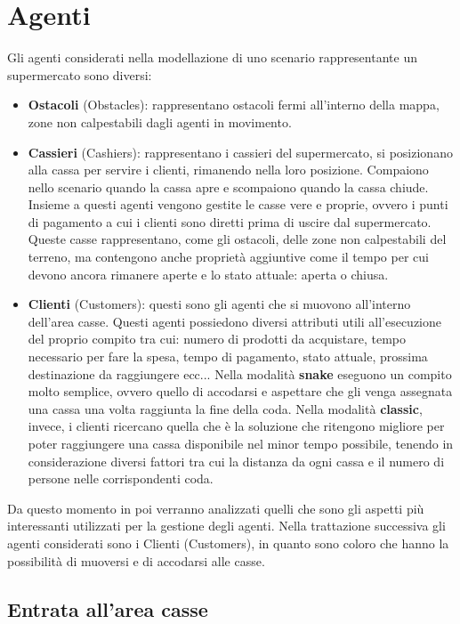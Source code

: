 \section{Agenti}

Gli agenti considerati nella modellazione di uno scenario rappresentante un supermercato sono diversi:

\begin{itemize}
    \item \textbf{Ostacoli} (Obstacles): rappresentano ostacoli fermi all'interno della mappa, zone non calpestabili dagli agenti in movimento.
    \item \textbf{Cassieri} (Cashiers): rappresentano i cassieri del supermercato, si posizionano alla cassa per servire i clienti, rimanendo nella loro posizione. Compaiono nello scenario quando la cassa apre e scompaiono quando la cassa chiude. Insieme a questi agenti vengono gestite le casse vere e proprie, ovvero i punti di pagamento a cui i clienti sono diretti prima di uscire dal supermercato. Queste casse rappresentano, come gli ostacoli, delle zone non calpestabili del terreno, ma contengono anche proprietà aggiuntive come il tempo per cui devono ancora rimanere aperte e lo stato attuale: aperta o chiusa. 
    \item \textbf{Clienti} (Customers): questi sono gli agenti che si muovono all'interno dell'area casse. Questi agenti possiedono diversi attributi utili all'esecuzione del proprio compito tra cui: numero di prodotti da acquistare, tempo necessario per fare la spesa, tempo di pagamento, stato attuale, prossima destinazione da raggiungere ecc...
    Nella modalità \textbf{snake} eseguono un compito molto semplice, ovvero quello di accodarsi e aspettare che gli venga assegnata una cassa una volta raggiunta la fine della coda. Nella modalità \textbf{classic}, invece, i clienti ricercano quella che è la soluzione che ritengono migliore per poter raggiungere una cassa disponibile nel minor tempo possibile, tenendo in considerazione diversi fattori tra cui la distanza da ogni cassa e il numero di persone nelle corrispondenti coda. 
\end{itemize}

Da questo momento in poi verranno analizzati quelli che sono gli aspetti più interessanti utilizzati per la gestione degli agenti. Nella trattazione successiva gli agenti considerati sono i Clienti (Customers), in quanto sono coloro che hanno la possibilità di muoversi e di accodarsi alle casse.

\subsection{Entrata all'area casse}


